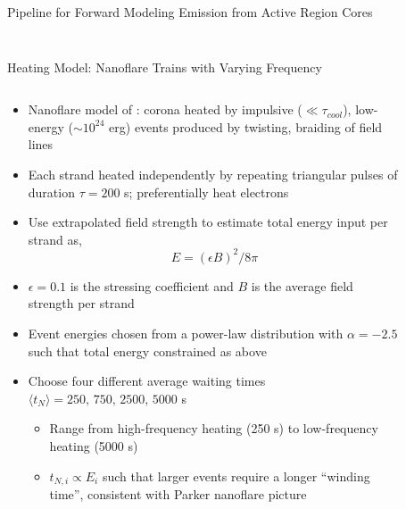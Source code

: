 \documentclass[final]{beamer}
\begin{document}
\begin{frame}
\begin{columns}[T]
\begin{column}{0.49\linewidth}
\begin{block}{Pipeline for Forward Modeling Emission from Active Region Cores}
\begin{columns}[T]
\begin{column}{0.39\columnwidth}
\begin{figure}
        \end{figure}
      \end{column}
      \end{columns}
    \end{block}
    \begin{block}{Heating Model: Nanoflare Trains with Varying Frequency}
      \begin{columns}[T]
      \begin{column}{0.49\columnwidth}
        \begin{itemize}
        \item Nanoflare model of \citet{parker_nanoflares_1988}: corona heated by impulsive ($\ll\tau_{cool}$), low-energy ($\sim10^{24}$ erg) events produced by twisting, braiding of field lines
        \item Each strand heated independently by repeating triangular pulses of duration $\tau=200$ s; preferentially heat electrons 
        \item Use extrapolated field strength to estimate total energy input per strand as,
          \begin{equation*}
            E = (\epsilon B)^2/8\pi
          \end{equation*}
        \item $\epsilon=0.1$ is the stressing coefficient and $B$ is the average field strength per strand
        \item Event energies chosen from a power-law distribution with $\alpha=-2.5$ such that total energy constrained as above
        \item Choose four different average waiting times $\langle t_N\rangle=250,\,750,\,2500,\,5000$ s 
        \begin{itemize}
          \item Range from high-frequency heating (250 s) to low-frequency heating (5000 s)
          \item $t_{N,i}\propto E_i$ such that larger events require a longer ``winding time'', consistent with Parker nanoflare picture \citep[e.g.][]{cargill_active_2014,barnes_inference_2016-1}
        \end{itemize}
        \end{itemize}
      \end{column}
      \begin{column}{0.49\columnwidth}
        \begin{figure}

\end{figure}
\end{column}
\end{columns}
\end{block}
\end{column}
\end{columns}
\end{frame}
\end{document}
